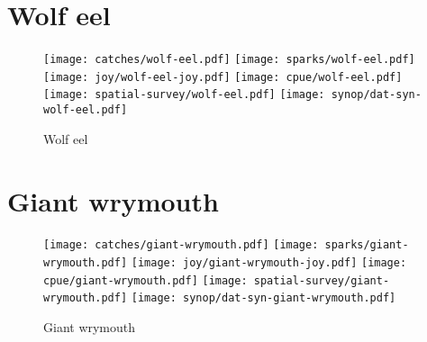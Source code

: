 \section*{Wolf eel}

\begin{figure}[htbp]
\centering
\texttt{[image: catches/wolf-eel.pdf]}
\texttt{[image: sparks/wolf-eel.pdf]}
\texttt{[image: joy/wolf-eel-joy.pdf]}
\texttt{[image: cpue/wolf-eel.pdf]}
\texttt{[image: spatial-survey/wolf-eel.pdf]}
\texttt{[image: synop/dat-syn-wolf-eel.pdf]}
\caption{Wolf eel}
\end{figure}
\clearpage
\section*{Giant wrymouth}

\begin{figure}[htbp]
\centering
\texttt{[image: catches/giant-wrymouth.pdf]}
\texttt{[image: sparks/giant-wrymouth.pdf]}
\texttt{[image: joy/giant-wrymouth-joy.pdf]}
\texttt{[image: cpue/giant-wrymouth.pdf]}
\texttt{[image: spatial-survey/giant-wrymouth.pdf]}
\texttt{[image: synop/dat-syn-giant-wrymouth.pdf]}
\caption{Giant wrymouth}
\end{figure}
\clearpage
